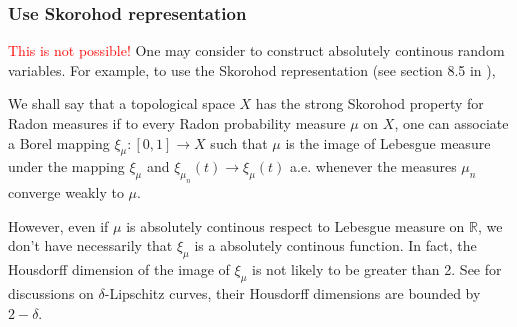 \subsubsection{Use Skorohod representation}
\textcolor{red}{This is not possible!}
One may consider to construct absolutely continous random variables.
For example, to use the Skorohod representation (see section 8.5 in \cite{Bogachev2007}),
\begin{defn}
	We shall say that a topological space \( X \) has the strong
	Skorohod property for Radon measures if to every Radon probability measure
	\( \mu \) on \( X \),
	one can associate a Borel mapping \( \xi _ { \mu } : [ 0,1 ] \rightarrow X \) such that \( \mu \) is
	the image of Lebesgue measure under the mapping \( \xi _ { \mu } \) and \( \xi _ { \mu _ { n } } ( t ) \rightarrow \xi _ { \mu } ( t ) \) a.e.
	whenever the measures \( \mu _ { n } \) converge weakly to \( \mu . \)
\end{defn}

However, even if $\mu$ is absolutely continous respect to Lebesgue measure on $\mathbb{R}$,
we don't have necessarily that $\xi_{\mu}$ is a absolutely continous function.
In fact, the Housdorff dimension of the image of $\xi_{\mu}$ is not likely to be greater than 2.
See \cite{Besicov1937Sets} for discussions on $\delta$-Lipschitz curves,
their Housdorff dimensions are bounded by $2-\delta$.

